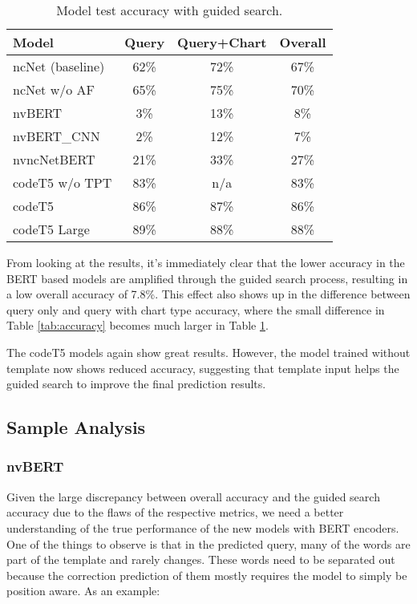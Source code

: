 \documentclass[
	a4paper, %
	10pt, %
	unnumberedsections, %
	twoside, %
]{t0003}
\begin{document}
\begin{table} %
	\caption{Model test accuracy with guided search.}
	\centering
	\begin{tabular}{lccc}
		\toprule
		Model & Query & Query+Chart & Overall \\
		\midrule
		ncNet (baseline) & 62\% &72\% & 67\% \\
		ncNet w/o AF & 65\% & 75\% & 70\% \\
		\hline
		nvBERT & 3\% & 13\% & 8\% \\
		nvBERT\_CNN & 2\% & 12\% & 7\% \\
		nvncNetBERT & 21\% & 33\% & 27\% \\
		\hline
		codeT5 w/o TPT & 83\% & n/a & 83\% \\
		codeT5 & 86\% & 87\% & 86\% \\
		codeT5 Large & 89\% & 88\% & 88\% \\
		\bottomrule
	\end{tabular}
	\label{tab:guidedaccuracy}
\end{table}

From looking at the results, it's immediately clear that the lower accuracy in the BERT based models are amplified through the guided search process, resulting in a low overall accuracy of 7.8\%. This effect also shows up in the difference between query only and query with chart type accuracy, where the small difference in Table \ref{tab:accuracy} becomes much larger in Table \ref{tab:guidedaccuracy}.

The codeT5 models again show great results. However, the model trained without template now shows reduced accuracy, suggesting that template input helps the guided search to improve the final prediction results.

\subsection{Sample Analysis}

\subsubsection{nvBERT} Given the large discrepancy between overall accuracy and the guided search accuracy due to the flaws of the respective metrics, we need a better understanding of the true performance of the new models with BERT encoders. One of the things to observe is that in the predicted query, many of the words are part of the template and rarely changes. These words need to be separated out because the correction prediction of them mostly requires the model to simply be position aware. As an example:
\end{document}

